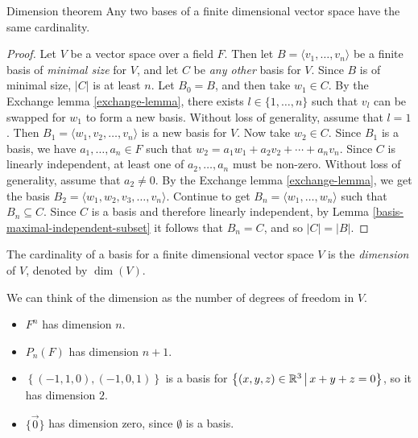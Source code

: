 \begin{thm}{Dimension theorem}\label{dimension-theorem}\proofbreak
    Any two bases of a finite dimensional vector space have the same cardinality.
\end{thm}

\begin{proof}
    Let $V$ be a vector space over a field $F$. Then let $B = \langle v_1, \ldots, v_n \rangle$ be a finite basis of \emph{minimal size} for $V$, and let $C$ be \emph{any other} basis for $V$. Since $B$ is of minimal size, $|C|$ is at least $n$. Let $B_0 = B$, and then take $w_1 \in C$. By the Exchange lemma \ref{exchange-lemma}, there exists $l \in \{1, \ldots, n\}$ such that $v_l$ can be swapped for $w_1$ to form a new basis. Without loss of generality, assume that $l = 1$. Then $B_1 = \langle w_1, v_2, \ldots, v_n \rangle$ is a new basis for $V$. Now take $w_2 \in C$. Since $B_1$ is a basis, we have $a_1, \ldots, a_n \in F$ such that $w_2 = a_1w_1 + a_2v_2 + \cdots + a_nv_n$. Since $C$ is linearly independent, at least one of $a_2, \ldots, a_n$  must be non-zero. Without loss of generality, assume that $a_2 \neq 0$. By the Exchange lemma \ref{exchange-lemma}, we get the basis $B_2 = \langle w_1, w_2, v_3, \ldots, v_n\rangle$. Continue to get $B_n = \langle w_1, \ldots, w_n \rangle$ such that $B_n \subseteq C$. Since $C$ is a basis and therefore linearly independent, by Lemma \ref{basis-maximal-independent-subset} it follows that $B_n = C$, and so $|C| = |B|$.
\end{proof}

\begin{defn}
    The cardinality of a basis for a finite dimensional vector space $V$ is the \emph{dimension} of $V$, denoted by $\dim(V)$.
\end{defn}

\begin{rmk}
    We can think of the dimension as the number of degrees of freedom in $V$.
\end{rmk}

\begin{exmp}\proofbreak
    \begin{itemize}
        \item $F^n$ has dimension $n$.
        \item $P_n(F)$ has dimension $n+1$.
        \item $\left\{(-1, 1, 0), (-1, 0, 1)\right\}$ is a basis for $\left\{\left(x, y, z\right) \in \mathbb{R}^3 \,\middle|\, x + y + z = 0 \right\}$, so it has dimension $2$.
        \item $\{\vec{0}\}$ has dimension zero, since $\emptyset$ is a basis.
    \end{itemize}
\end{exmp}

